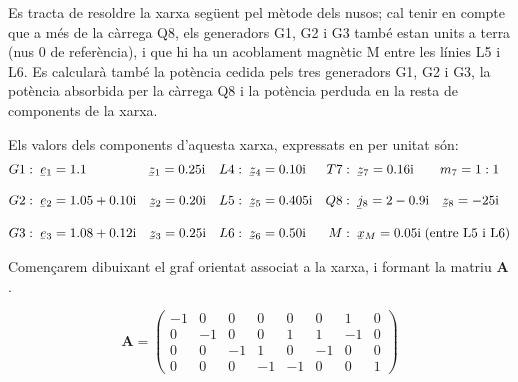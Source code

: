 \begin{exemple}\label{ex:metode-nusos}
    Es tracta de resoldre la xarxa següent pel mètode dels nusos; cal
    tenir en compte que a més de la càrrega Q8, els generadors G1, G2 i
    G3 també estan units a terra (nus 0 de referència), i que hi ha un
    acoblament magnètic M entre les línies L5 i L6. Es calcularà també
    la potència cedida pels tres generadors G1, G2 i G3, la potència
    absorbida per la càrrega Q8 i la potència perduda en la resta de
    components de la xarxa.
    \begin{center}
       
    \end{center}

    Els valors dels components d'aquesta xarxa, expressats en per unitat són:
    \begin{align*}
       G1 &:\; \cmplx{e}_1 = \num{1,1} \qquad\qquad\;\;\, \cmplx{z}_1 = \complexnum{j 0,25} & L4 &:\; \cmplx{z}_4 = \complexnum{j 0,10} & T7 &:\; \cmplx{z}_7 = \complexnum{j 0,16} \quad\quad m_7=1:1\\*[3mm]
       G2 &:\; \cmplx{e}_2 = \complexnum{1,05+j0,10} \quad \cmplx{z}_2 = \complexnum{j 0,20} & L5 &:\; \cmplx{z}_5 = \complexnum{j 0,405}  & Q8 &:\; \cmplx{j}_8 = \complexnum{2-j0,9} \quad \cmplx{z}_8 = \complexnum{-j25} \\[3mm]
       G3 &:\; \cmplx{e}_3 = \complexnum{1,08+j0,12} \quad \cmplx{z}_3 = \complexnum{j 0,25} & L6 &:\; \cmplx{z}_6 = \complexnum{j 0,50} & M &:\; \cmplx{x}_M = \complexnum{j0,05}\; \text{(entre L5 i L6)}
    \end{align*}

    Començarem dibuixant el graf orientat associat a la xarxa, i formant la matriu $\boldsymbol{A}$.
    \begin{center}
         
    \end{center}

    \[
       \boldsymbol{A} = \left( \begin{array}{rrrrrrrr}
         -1 & 0 & 0 & 0 & 0 & 0 & 1 & 0 \\
         0 & -1 & 0 & 0 & 1 & 1 & -1 & 0 \\
         0 & 0 & -1 & 1 & 0 & -1 & 0 & 0 \\
         0 & 0 & 0 & -1 & -1 & 0 & 0 & 1
       \end{array}\right)
    \]


\end{exemple}
